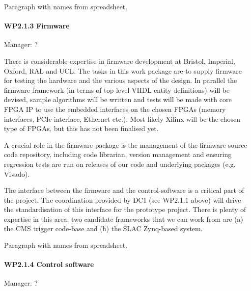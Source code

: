Paragraph with names from spreadsheet.

\paragraph{WP2.1.3 Firmware} Manager: ?

\noindent
There is considerable expertise in firmware development at Bristol, 
Imperial, Oxford, RAL and UCL.   The tasks in this work package are to 
supply firmware for testing the hardware and the various aspects of the 
design.   In parallel the firmware framework (in terms of top-level VHDL 
entity definitions) will be devised, sample algorithms will be written
and tests will be made with core FPGA IP to use the embedded interfaces on 
the chosen FPGAs (memory interfaces, PCIe interface, Ethernet etc.).
Most likely Xilinx will be the chosen type of FPGAs, but this has not 
been finalised yet.   

A crucial role in the firmware package is the management 
of the firmware source code repository, including code librarian, 
version management and ensuring regression tests are run on releases 
of our code and underlying packages (e.g. Vivado). 

The interface between the firmware and the control-software is a 
critical part of the project.  The coordination provided by DC\/1 
(see WP2.1.1 above) will drive the standardisation of this interface 
for the prototype project.  There is plenty of expertise in this area; 
two candidate frameworks that we can work from are (a) the CMS 
trigger code-base and (b) the SLAC Zynq-based system.  

Paragraph with names from spreadsheet.

\paragraph{WP2.1.4 Control software} Manager: ?

